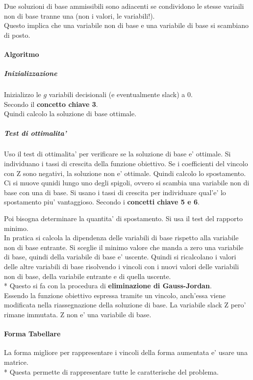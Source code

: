 Due soluzioni di base ammissibili sono adiacenti se condividono le stesse variaili non di base tranne una (non i valori, le variabili!). \\
Questo implica che una variabile non di base e una variabile di base si scambiano di posto.

\paragraph{Algoritmo}

\subparagraph{Inizializzazione}

Inizializzo le $g$ variabili decisionali (e eventualmente slack) a 0. \\
Secondo il \textbf{concetto chiave 3}. \\
Quindi calcolo la soluzione di base ottimale.

\subparagraph{Test di ottimalita'}

Uso il test di ottimalita' per verificare se la soluzione di base e' ottimale.
Si individuano i tassi di crescita della funzione obiettivo. Se i coefficienti del vincolo con Z sono negativi, la soluzione non e' ottimale. Quindi calcolo lo spostamento. \\

Ci si muove qunidi lungo uno degli spigoli, ovvero si scambia una variabile non di base con una di base.
Si usano i tassi di crescita per individuare qual'e' lo spostamento piu' vantaggioso. Secondo i \textbf{concetti chiave 5 e 6}.

Poi bisogna determinare la quantita' di spostamento. Si usa il test del rapporto minimo. \\
In pratica si calcola la dipendenza delle variabili di base rispetto alla variabile non di base entrante.
Si sceglie il minimo valore che manda a zero una variabile di base, quindi della variabile di base e' uscente.
Quindi si ricalcolano i valori delle altre variabili di base risolvendo i vincoli con i nuovi valori delle variabili non di base, della variabile entrante e di quella uscente. \\*
Questo si fa con la procedura di \textbf{eliminazione di Gauss-Jordan}. \\

Essendo la funzione obiettivo espressa tramite un vincolo, anch'essa viene modificata nella riassegnazione della soluzione di base. La variabile slack Z pero' rimane immutata. Z non e' una variabile di base. \\

\paragraph{Forma Tabellare}

La forma migliore per rappresentare i vincoli della forma aumentata e' usare una matrice. \\*
Questa permette di rappresentare tutte le caratterische del problema.


